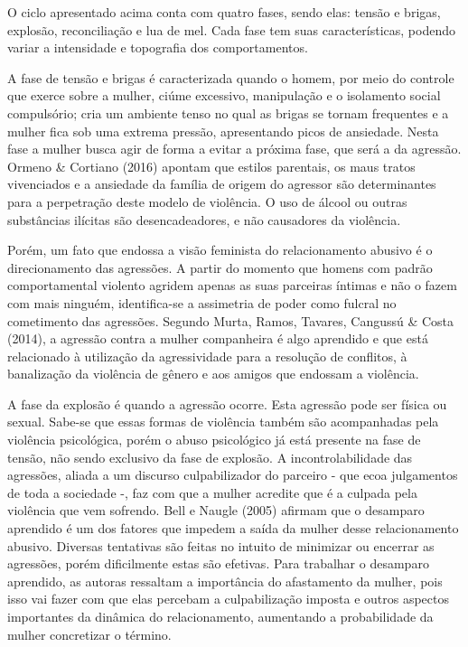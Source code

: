 O ciclo apresentado acima conta com quatro fases, sendo elas: tensão e brigas, explosão, reconciliação e lua de mel. Cada fase tem suas características, podendo variar a intensidade e topografia dos comportamentos.

A fase de tensão e brigas é caracterizada quando o homem, por meio do controle que exerce sobre a mulher, ciúme excessivo, manipulação e o isolamento social compulsório; cria um ambiente tenso no qual as brigas se tornam frequentes e a mulher fica sob uma extrema pressão, apresentando picos de ansiedade. Nesta fase a mulher busca agir de forma a evitar a próxima fase, que será a da agressão. Ormeno \& Cortiano (2016) apontam que estilos parentais, os maus tratos vivenciados e a ansiedade da família de origem do agressor são determinantes para a perpetração deste modelo de violência. O uso de álcool ou outras substâncias ilícitas são desencadeadores, e não causadores da violência.

Porém, um fato que endossa a visão feminista do relacionamento abusivo é o direcionamento das agressões. A partir do momento que homens com padrão comportamental violento agridem apenas as suas parceiras íntimas e não o fazem com mais ninguém, identifica-se a assimetria de poder como fulcral no cometimento das agressões. Segundo Murta, Ramos, Tavares, Cangussú \& Costa (2014), a agressão contra a mulher companheira é algo aprendido e que está relacionado à utilização da agressividade para a resolução de conflitos, à banalização da violência de gênero e aos amigos que endossam a violência.

A fase da explosão é quando a agressão ocorre. Esta agressão pode ser física ou sexual. Sabe-se que essas formas de violência também são acompanhadas pela violência psicológica, porém o abuso psicológico já está presente na fase de tensão, não sendo exclusivo da fase de explosão. A incontrolabilidade das agressões, aliada a um discurso culpabilizador do parceiro - que ecoa julgamentos de toda a sociedade -, faz com que a mulher acredite que é a culpada pela violência que vem sofrendo. Bell e Naugle (2005) afirmam que o desamparo aprendido é um dos fatores que impedem a saída da mulher desse relacionamento abusivo. Diversas tentativas são feitas no intuito de minimizar ou encerrar as agressões, porém dificilmente estas são efetivas. Para trabalhar o desamparo aprendido, as autoras ressaltam a importância do afastamento da mulher, pois isso vai fazer com que elas percebam a culpabilização imposta e outros aspectos importantes da dinâmica do relacionamento, aumentando a probabilidade da mulher concretizar o término.

